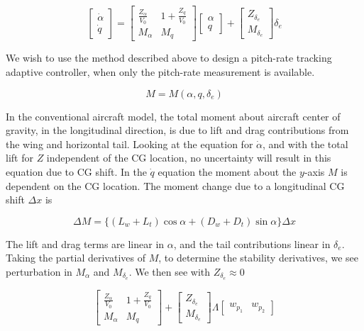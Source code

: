 \begin{equation}
  \begin{bmatrix}
    \dot{\alpha} \\
    \dot{q}
  \end{bmatrix}=
  \begin{bmatrix}
    \frac{Z_{\alpha}}{V_{0}} & 1+\frac{Z_{q}}{V_{0}} \\
    M_{\alpha} & M_{q}
  \end{bmatrix}
  \begin{bmatrix}
    \alpha \\
    q
  \end{bmatrix}+
  \begin{bmatrix}
    Z_{\delta_{e}} \\
    M_{\delta_{e}}
  \end{bmatrix}
  \delta_{e}
\end{equation}

We wish to use the method described above to design a pitch-rate tracking adaptive controller, when only the pitch-rate measurement is available.

\begin{equation*}
  M=M(\alpha,q,\delta_{e})
\end{equation*}

In the conventional aircraft model, the total moment about aircraft center of gravity, in the longitudinal direction, is due to lift and drag contributions from the wing and horizontal tail.
Looking at the equation for $\dot{\alpha}$, and with the total lift for $Z$ independent of the CG location, no uncertainty will result in this equation due to CG shift.
In the $\dot{q}$ equation the moment about the $y$-axis $M$ is dependent on the CG location.
The moment change due to a longitudinal CG shift $\Delta x$ is

\begin{equation*}
  \Delta M=\bigr\{(L_{w}+L_{t})\cos\alpha+(D_{w}+D_{t})\sin\alpha\bigr\}\Delta x
\end{equation*}

The lift and drag terms are linear in $\alpha$, and the tail contributions linear in $\delta_{e}$.
Taking the partial derivatives of $M$, to determine the stability derivatives, we see perturbation in $M_{\alpha}$ and $M_{\delta_{e}}$.
We then see with $Z_{\delta_{e}}\approx0$

\begin{equation*}
  \begin{bmatrix}
    \frac{Z_{\alpha}}{V_{0}} & 1+\frac{Z_{q}}{V_{0}} \\
    M_{\alpha} & M_{q}
  \end{bmatrix}
  +
  \begin{bmatrix}
    Z_{\delta_{e}} \\
    M_{\delta_{e}}
  \end{bmatrix}
  \Lambda
  \begin{bmatrix}
    w_{p_{1}} &
    w_{p_{2}}
  \end{bmatrix}
\end{equation*}


